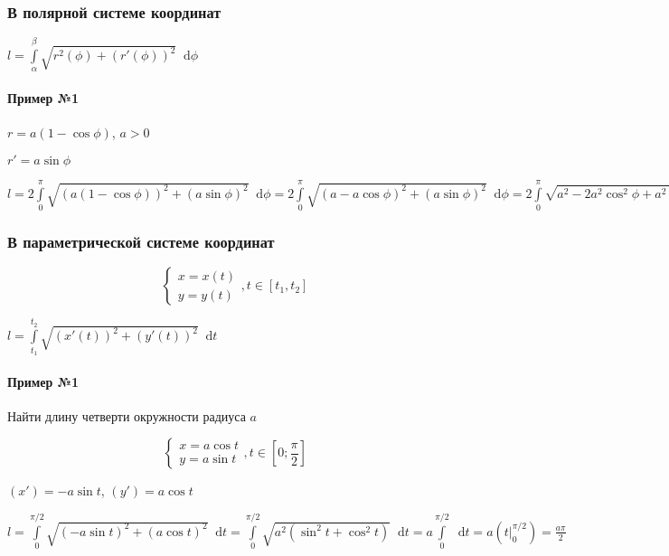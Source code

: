 \documentclass{article}
\newcommand*\diff{\mathop{}\!\mathrm{d}}
\begin{document}
\subsubsection{В полярной системе координат}

$l = \int\limits_{\alpha}^{\beta} \sqrt{r^2 (\phi) + (r'(\phi))^2} \diff \phi$

\paragraph{Пример №1}

$r = a (1 - \cos \phi)$, $a > 0$

$r' = a \sin \phi$

$l = 2 \int\limits_{0}^{\pi} \sqrt{(a (1 - \cos \phi))^2 + (a \sin \phi)^2} \diff \phi = 2 \int\limits_{0}^{\pi} \sqrt{(a - a \cos \phi)^2 + (a \sin \phi)^2} \diff \phi = 2 \int\limits_{0}^{\pi} \sqrt{a^2 - 2a^2 \cos^2 \phi + a^2 \sin^2 \phi} \diff \phi = 2 \int\limits_{0}^{\pi} \sqrt{a^2 ( 1 - 2\cos \phi + \cos^2 \phi + \sin^2 \phi ) } \diff \phi = 2a \int\limits_{0}^{\pi} \sqrt{2 - 2 \cos \phi } \diff \phi = 2 a \int\limits_{0}^{\pi} \sqrt{4 (\frac{1 - \cos \phi}{2})} \diff \phi = 4 a \int \limits_{0}^{\pi} \sqrt{\sin^2 \frac{\phi}{2}} \diff \phi = 4 a \int\limits_{0}^{\pi} \sin \frac{\phi}{2} \diff \phi = 4 a ( - 2 \cos \frac{\phi}{2} ) \bigg|_{0}^{\pi} = 4 a ( - (-2)) = 8 agith$

\subsubsection{В параметрической системе координат}

\begin{equation}
\begin{cases}
	x = x(t) \\
	y = y(t)
\end{cases}, t \in [t_1, t_2]
\end{equation}

$l = \int\limits_{t_1}^{t_2} \sqrt{(x'(t))^2 + (y'(t))^2} \diff t$

\paragraph{Пример №1}

Найти длину четверти окружности радиуса $a$

\begin{equation}
	\begin{cases}
		x = a \cos t \\
		y = a \sin t
	\end{cases}, t \in [0; \frac{\pi}{2}]
\end{equation}

$(x') = - a \sin t$, $(y') = a \cos t$

$l = \int\limits_{0}^{\pi/2} \sqrt{(-a \sin t)^2 + (a \cos t)^2} \diff t = \int\limits_{0}^{\pi/2} \sqrt{a^2 (\sin^2 t + \cos^2 t)} \diff t = a \int\limits_{0}^{\pi/2} \diff t = a (t \bigg|_{0}^{\pi/2}) = \frac{a \pi}{2}$
\end{document}
